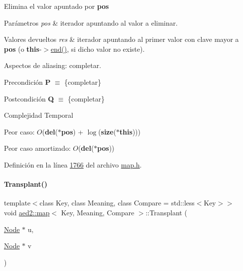 Elimina el valor apuntado por {\bfseries pos} 


\begin{DoxyParams}{Parámetros}
{\em pos} & iterador apuntando al valor a eliminar. \\
\hline
\end{DoxyParams}

\begin{DoxyRetVals}{Valores devueltos}
{\em res} & iterador apuntando al primer valor con clave mayor a {\bfseries pos} (o {\bfseries this}-\/$>$\hyperlink{classaed2_1_1map_a76023e6a56cb625513e1b5ea028bf983_a76023e6a56cb625513e1b5ea028bf983}{end()}, si dicho valor no existe).\\
\hline
\end{DoxyRetVals}
\begin{DoxyParagraph}{Aspectos de aliasing\+:}
completar.
\end{DoxyParagraph}
\begin{DoxyPrecond}{Precondición}
{\bfseries P} $\equiv$ \{completar\} 
\end{DoxyPrecond}
\begin{DoxyPostcond}{Postcondición}
{\bfseries Q} $\equiv$ \{completar\}
\end{DoxyPostcond}

\begin{DoxyDescription}
\item[Complejidad Temporal]
\begin{DoxyItemize}
\item Peor caso\+: $O$({\bfseries del}({\bfseries $\ast$pos}) + $\log$({\bfseries size}({\bfseries $\ast$this})))
\item Peor caso amortizado\+: $O$({\bfseries del}({\bfseries $\ast$pos})) 
\end{DoxyItemize}
\end{DoxyDescription}

Definición en la línea \hyperlink{map_8h_source_l01766}{1766} del archivo \hyperlink{map_8h_source}{map.\+h}.

\mbox{\label{classaed2_1_1map_a6c9fb4a85c0e8d2de5dcbdbc0d695be5_a6c9fb4a85c0e8d2de5dcbdbc0d695be5}} 
\paragraph{\texorpdfstring{Transplant()}{Transplant()}}
{\footnotesize\ttfamily template$<$class Key, class Meaning, class Compare = std\+::less$<$\+Key$>$$>$ \\
void \hyperlink{classaed2_1_1map}{aed2\+::map}$<$ Key, Meaning, Compare $>$\+::Transplant (\begin{DoxyParamCaption}\item[{\hyperlink{structaed2_1_1map_1_1Node}{Node} $\ast$}]{u,  }\item[{\hyperlink{structaed2_1_1map_1_1Node}{Node} $\ast$}]{v }\end{DoxyParamCaption})\hspace{0.3cm}{\ttfamily [inline]}}




